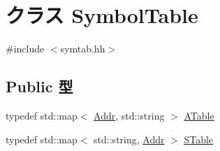 \hypertarget{classSymbolTable}{
\section{クラス SymbolTable}
\label{classSymbolTable}
}


{\ttfamily \#include $<$symtab.hh$>$}\subsection*{Public 型}
\begin{DoxyCompactItemize}
\item 
typedef std::map$<$ \hyperlink{base_2types_8hh_af1bb03d6a4ee096394a6749f0a169232}{Addr}, std::string $>$ \hyperlink{classSymbolTable_a774a5b092c28960e65c8301f26a0bf88}{ATable}
\item 
typedef std::map$<$ std::string, \hyperlink{base_2types_8hh_af1bb03d6a4ee096394a6749f0a169232}{Addr} $>$ \hyperlink{classSymbolTable_ad1bd5f7577278d0dd7a1b10fe53e8d9e}{STable}
\end{DoxyCompactItemize}
